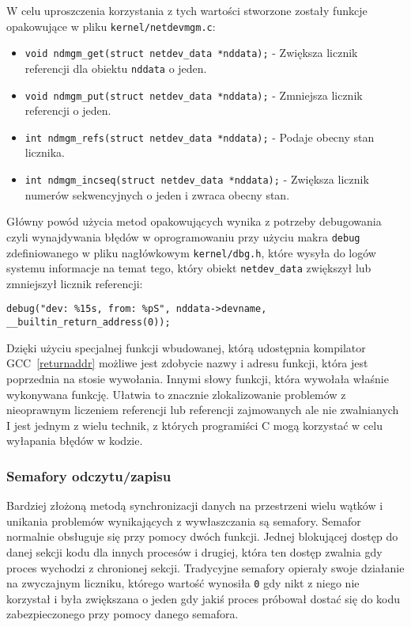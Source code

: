 \documentclass[10pt]{scrartcl}
\begin{document}
W celu uproszczenia korzystania z tych wartości stworzone zostały funkcje opakowujące w pliku \texttt{kernel/netdevmgm.c}:

\begin{itemize}
\itemsep1pt\parskip0pt
\item
  \texttt{void ndmgm\_get(struct netdev\_data *nddata);} - Zwiększa licznik referencji dla obiektu \texttt{nddata} o jeden.
\item
  \texttt{void ndmgm\_put(struct netdev\_data *nddata);} - Zmniejsza licznik referencji o jeden.
\item
  \texttt{int ndmgm\_refs(struct netdev\_data *nddata);} - Podaje obecny stan licznika.
\item
  \texttt{int ndmgm\_incseq(struct netdev\_data *nddata);} - Zwiększa licznik numerów sekwencyjnych o jeden i zwraca obecny stan.
\end{itemize}

Główny powód użycia metod opakowujących wynika z potrzeby debugowania czyli wynajdywania błędów w oprogramowaniu przy użyciu makra \texttt{debug} zdefiniowanego w pliku nagłówkowym \texttt{kernel/dbg.h}, które wysyła do logów systemu informacje na temat tego, który obiekt \texttt{netdev\_data} zwiększył lub zmniejszył licznik referencji:

\begin{verbatim}
debug("dev: %15s, from: %pS", nddata->devname, __builtin_return_address(0));
\end{verbatim}

Dzięki użyciu specjalnej funkcji wbudowanej, którą udostępnia kompilator GCC~\ref{returnaddr} możliwe jest zdobycie nazwy i adresu funkcji, która jest poprzednia na stosie wywołania. Innymi słowy funkcji, która wywołała właśnie wykonywana funkcję. Ułatwia to znacznie zlokalizowanie problemów z nieoprawnym liczeniem referencji lub referencji zajmowanych ale nie zwalnianych I jest jednym z wielu technik, z których programiści C mogą korzystać w celu wyłapania błędów w kodzie.

\subsubsection{Semafory odczytu/zapisu}

Bardziej złożoną metodą synchronizacji danych na przestrzeni wielu wątków i unikania problemów wynikających z wywłaszczania są semafory.  Semafor normalnie obsługuje się przy pomocy dwóch funkcji. Jednej blokującej dostęp do danej sekcji kodu dla innych procesów i drugiej, która ten dostęp zwalnia gdy proces wychodzi z chronionej sekcji.  Tradycyjne semafory opierały swoje działanie na zwyczajnym liczniku, którego wartość wynosiła \texttt{0} gdy nikt z niego nie korzystał i była zwiększana o jeden gdy jakiś proces próbował dostać się do kodu zabezpieczonego przy pomocy danego semafora.
\end{document}
